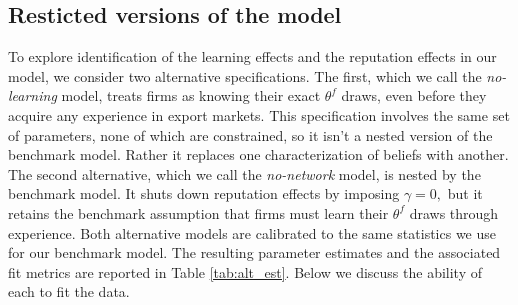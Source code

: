 \bigskip

\subsection{Resticted versions of the model}

To explore identification of the learning effects and the reputation effects
in our model, we consider two alternative specifications. The first, which
we call the \textit{no-learning} model, treats firms as knowing their exact $%
\theta ^{f}$ draws, even before they acquire any experience in export
markets. This specification involves the same set of parameters, none of
which are constrained, so it isn't a nested version of the benchmark model.
Rather it replaces one characterization of beliefs with another. The second
alternative, which we call the \textit{no-network} model, is nested by the
benchmark model. It shuts down reputation effects by imposing $\gamma =0,$
but it retains the benchmark assumption that firms must learn their $\theta
^{f}$ draws through experience. Both alternative models are calibrated to the same statistics we use for our
benchmark model. The resulting parameter estimates and the associated fit
metrics are reported in Table \ref{tab:alt_est}. Below we discuss the ability of each to
fit the data.\bigskip

